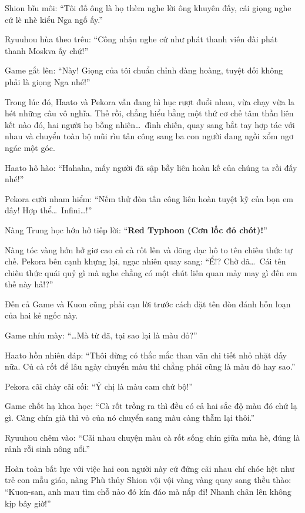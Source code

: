 \documentclass[../main.tex]{subfiles}
\begin{document}
Shion bĩu môi: ``Tôi đố ông là họ thèm nghe lời ông khuyên đấy, cái giọng nghe cứ lè nhè kiểu Nga ngố ấy.''

Ryuuhou hùa theo trêu: ``Công nhận nghe cứ như phát thanh viên đài phát thanh Moskva ấy chứ!''

Game gắt lên: ``Này! Giọng của tôi chuẩn chỉnh đàng hoàng, tuyệt đối không phải là giọng Nga nhé!''

Trong lúc đó, Haato và Pekora vẫn đang hì hục rượt đuổi nhau, vừa chạy vừa la hét những câu vô nghĩa. Thế rồi, chẳng hiểu bằng một thứ cơ chế tâm thần liên kết nào đó, hai người họ bỗng nhiên\dots\ đình chiến, quay sang bắt tay hợp tác với nhau và chuyển toàn bộ mũi rìu tấn công sang ba con người đang ngồi xổm ngơ ngác một góc.

Haato hô hào: ``Hahaha, mấy người đã sập bẫy liên hoàn kế của chúng ta rồi đấy nhé!''

Pekora cười nham hiểm: ``Nếm thử đòn tấn công liên hoàn tuyệt kỹ của bọn em đây! Hợp thể\dots\ Infini\dots!''

Nàng Trung học hớn hở tiếp lời: ``\textbf{Red Typhoon (Cơn lốc đỏ chót)!}''

Nàng tóc vàng hớn hở giơ cao củ cà rốt lên và dõng dạc hô to tên chiêu thức tự chế. Pekora bên cạnh khựng lại, ngạc nhiên quay sang: ``Ể!? Chờ đã\dots\ Cái tên chiêu thức quái quỷ gì mà nghe chẳng có một chút liên quan mảy may gì đến em thế này hả!?''


Đến cả Game và Kuon cũng phải cạn lời trước cách đặt tên đòn đánh hỗn loạn của hai kẻ ngốc này.

Game nhíu mày: ``\dots Mà từ đã, tại sao lại là màu đỏ?''

Haato hồn nhiên đáp: ``Thôi đừng có thắc mắc than vãn chi tiết nhỏ nhặt đấy nữa. Củ cà rốt để lâu ngày chuyển màu thì chẳng phải cũng là màu đỏ hay sao.''

Pekora cãi chày cãi cối: ``Ý chị là màu cam chứ bộ!''

Game chốt hạ khoa học: ``Cà rốt trồng ra thì đều có cả hai sắc độ màu đó chứ lạ gì. Càng chín già thì vỏ của nó chuyển sang màu càng thẫm lại thôi.''

Ryuuhou chêm vào: ``Cãi nhau chuyện màu cà rốt sống chín giữa mùa hè, đúng là rảnh rỗi sinh nông nổi.''

Hoàn toàn bất lực với việc hai con người này cứ đứng cãi nhau chí chóe hệt như trẻ con mẫu giáo, nàng Phù thủy Shion vội vội vàng vàng quay sang thều thào: ``Kuon-san, anh mau tìm chỗ nào đó kín đáo mà nấp đi! Nhanh chân lên không kịp bây giờ!''
\end{document}
